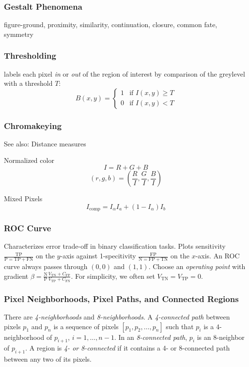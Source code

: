 \documentclass[a4paper,10pt]{article}
\begin{document}
\subsubsection{Gestalt Phenomena}
figure-ground, proximity, similarity, continuation, closure, common fate, symmetry

\subsubsection{Thresholding}
labels each pixel \emph{in} or \emph{out} of the region of interest by comparison of the greylevel with a threshold \(T\):
\[B(x, y) = \begin{cases} 1 & \text{if } I(x, y) \geq T\\ 0 & \text{if } I(x, y) < T\end{cases}\]

\subsubsection{Chromakeying}
See also: Distance measures
\begin{subbox}{Normalized color}
    \[I = R + G + B\]
    \[(r, g, b) = \left(\frac{R}{I}, \frac{G}{I}, \frac{B}{I}\right)\]
\end{subbox}
\begin{subbox}{Mixed Pixels}
    \[I_\text{comp} = I_\alpha I_a + (1 - I_\alpha) I_b\]
\end{subbox}

\subsubsection{ROC Curve}
Characterizes error trade-off in binary classification tasks. Plots sensitivity \(\frac{\text{TP}}{\text{P} = \text{TP} + \text{FN}}\) on the \(y\)-axis against 1-specitivity \(\frac{\text{FP}}{\text{N} = \text{FP} + \text{TN}}\) on the \(x\)-axis. An ROC curve always passes through \((0, 0)\) and \((1, 1)\). Choose an \emph{operating point} with gradient \(\beta = \frac{\text{N}}{\text{P}} \frac{V_\text{TN} + C_\text{FP}}{V_\text{TP} + C_\text{FN}}\). For simplicity, we often set \(V_\text{TN} = V_\text{TP} = 0\).

\subsubsection{Pixel Neighborhoods, Pixel Paths, and Connected Regions} There are \emph{4-neighborhoods} and \emph{8-neighborhoods}. A \emph{4-connected path} between pixels \(p_1\) and \(p_n\) is a sequence of pixels \([p_1, p_2, \dots, p_n]\) such that \(p_i\) is a 4-neighborhood of \(p_{i + 1}\), \(i = 1, \dots, n - 1\). In an \emph{8-connected path}, \(p_i\) is an 8-neighbor of \(p_{i + 1}\). A region is \emph{4- or 8-connected} if it contains a 4- or 8-connected path between any two of its pixels.
\end{document}
